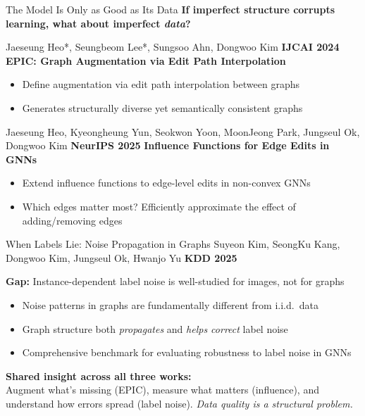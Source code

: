\documentclass[aspectratio=169,11pt]{beamer}
\newcommand{\papercite}[1]{{\scriptsize\color{mutedText}#1}}
\newcommand{\venue}[1]{{\small\textcolor{postechBlue}{\textbf{#1}}}}
\begin{document}
\begin{frame}{The Model Is Only as Good as Its Data}
  \textbf{If imperfect structure corrupts learning, what about imperfect \textit{data}?}
  \vspace{8pt}

  \papercite{Jaeseung Heo*, Seungbeom Lee*, Sungsoo Ahn, Dongwoo Kim \hfill \venue{IJCAI 2024}}
  \vspace{2pt}
  \textbf{EPIC: Graph Augmentation via Edit Path Interpolation}
  \begin{itemize}
    \item Define augmentation via \alert{edit path interpolation} between graphs
    \item Generates structurally diverse yet semantically consistent graphs
  \end{itemize}

  \vspace{8pt}

  \papercite{Jaeseung Heo, Kyeongheung Yun, Seokwon Yoon, MoonJeong Park, Jungseul Ok, Dongwoo Kim \hfill \venue{NeurIPS 2025}}
  \vspace{2pt}
  \textbf{Influence Functions for Edge Edits in GNNs}
  \begin{itemize}
    \item Extend \alert{influence functions} to edge-level edits in non-convex GNNs
    \item Which edges matter most? Efficiently approximate the effect of adding/removing edges
  \end{itemize}
\end{frame}

\begin{frame}{When Labels Lie: Noise Propagation in Graphs}
  \papercite{Suyeon Kim, SeongKu Kang, Dongwoo Kim, Jungseul Ok, Hwanjo Yu \hfill \venue{KDD 2025}}
  \vspace{8pt}

  \textbf{Gap:} Instance-dependent label noise is well-studied for images, not for graphs
  \vspace{6pt}

  \begin{itemize}
    \item Noise patterns in graphs are fundamentally different from i.i.d.\ data
    \item Graph structure both \textit{propagates} and \textit{helps correct} label noise
    \item Comprehensive benchmark for evaluating robustness to label noise in GNNs
  \end{itemize}
  \vspace{8pt}

  \textbf{Shared insight across all three works:}\\
  {\small Augment what's missing (EPIC), measure what matters (influence), and understand how errors spread (label noise). \textit{Data quality is a structural problem.}}
\end{frame}
\end{document}
